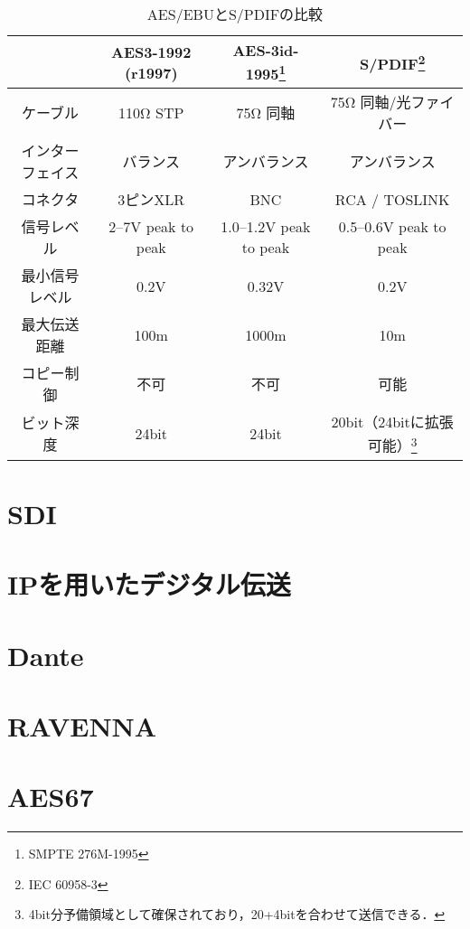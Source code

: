 \begin{table}[htb]
  \begin{minipage}{\textwidth}
    \label{tab:compare}
    \caption{AES/EBUとS/PDIFの比較\cite{aesebuandspdif}}
    \begin{tabular}{c|ccc} \hline
      & AES3-1992 (r1997) & AES-3id-1995\footnote{SMPTE 276M-1995} & S/PDIF\footnote{IEC 60958-3} \\ \hline \hline
      ケーブル & 110Ω STP & 75Ω 同軸 & 75Ω 同軸/光ファイバー \\
      インターフェイス & バランス & アンバランス & アンバランス \\
      コネクタ & 3ピンXLR & BNC & RCA / TOSLINK \\
      信号レベル & 2--7V peak to peak & 1.0--1.2V peak to peak & 0.5--0.6V peak to peak \\
      最小信号レベル & 0.2V & 0.32V & 0.2V \\
      最大伝送距離 & 100m & 1000m & 10m \\
      コピー制御 & 不可 & 不可 & 可能 \\
      ビット深度 & 24bit & 24bit & 20bit（24bitに拡張可能）\footnote{4bit分予備領域として確保されており，20+4bitを合わせて送信できる．} \\
    \end{tabular}
  \end{minipage}
\end{table}

\section{SDI}

\section*{IPを用いたデジタル伝送}

\section{Dante}

\section{RAVENNA}

\section{AES67}
